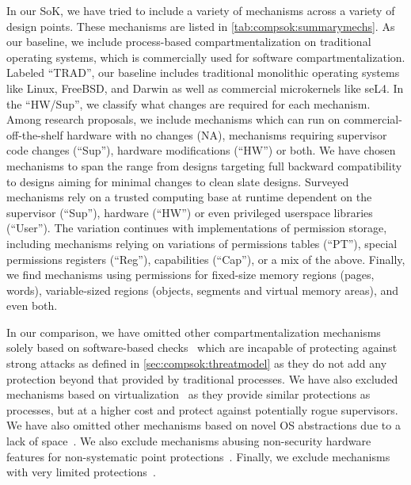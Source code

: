 In our SoK, we have tried to include a variety of mechanisms across a variety of
design points.
These mechanisms are listed in \autoref{tab:compsok:summarymechs}.
As our baseline, we include process-based compartmentalization on traditional
operating systems, which is commercially used for software compartmentalization.
Labeled ``TRAD'', our baseline includes traditional monolithic operating systems 
like Linux, FreeBSD, and Darwin as well as commercial microkernels like seL4.
In the ``HW/Sup'', we classify what changes are required for each mechanism.
Among research proposals, we include mechanisms which can run on 
commercial-off-the-shelf hardware with no changes (NA), 
mechanisms requiring supervisor code changes (``Sup''),
hardware modifications (``HW'') or both.
We have chosen mechanisms to span the range from designs targeting full 
backward compatibility to designs aiming for minimal changes to clean slate designs.
Surveyed mechanisms rely on a trusted computing base at runtime dependent on
the supervisor (``Sup''), hardware (``HW'') or even privileged userspace
libraries (``User'').
The variation continues with implementations of permission storage, including
mechanisms relying on variations of permissions tables (``PT''), special
permissions registers (``Reg''), capabilities (``Cap''), or a mix of the
above.
Finally, we find mechanisms using permissions for fixed-size memory regions 
(pages, words), variable-sized regions (objects, segments and virtual memory areas),
and even both.

In our comparison, we have omitted other compartmentalization mechanisms
solely based on software-based checks~\cite{WahbeLAG93} 
which are incapable of protecting against strong attacks as defined in 
\autoref{sec:compsok:threatmodel} as they
do not add any protection beyond that provided by traditional processes.
We have also excluded mechanisms based on 
virtualization~\cite{BelayBMTMK12, KoningCBGA17, LiuZCCX15, McCuneLQZDGP10, SharifLCL09}
as they provide similar protections as processes, 
but at a higher cost and protect against potentially rogue supervisors.
We have also omitted other mechanisms based on novel OS abstractions due to a
lack of space~\cite{HsuHEP16, DautenhahnKDCA15, ChenRSL16, BittauMHK08}.
We also exclude mechanisms abusing non-security hardware features for non-systematic
point protections~\cite{HedayatiGJCSSM19Hodor, GuanLLJW15}.
Finally, we exclude mechanisms with very limited protections~\cite{FrassettoJLS18}.

